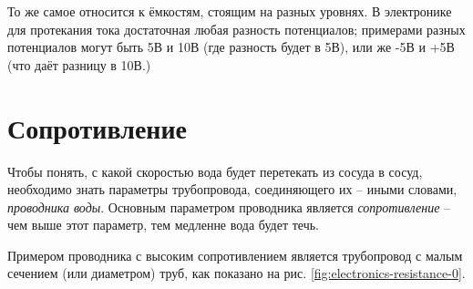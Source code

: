 \documentclass[a4paper,twoside]{book}
\begin{document}
То же самое относится к ёмкостям, стоящим на разных уровнях.  В электронике для
протекания тока достаточная любая разность потенциалов; примерами разных
потенциалов могут быть 5В и 10В (где разность будет в 5В), или же -5В и +5В (что
даёт разницу в 10В.)

\section{Сопротивление}

Чтобы понять, с какой скоростью вода будет перетекать из сосуда в сосуд,
необходимо знать параметры трубопровода, соединяющего их -- иными словами,
\emph{проводника воды}.  Основным параметром проводника является
\emph{сопротивление} -- чем выше этот параметр, тем медленне вода будет течь.

Примером проводника с высоким сопротивлением является трубопровод с малым
сечением (или диаметром) труб, как показано на
рис. \ref{fig:electronics-resistance-0}.
\end{document}
